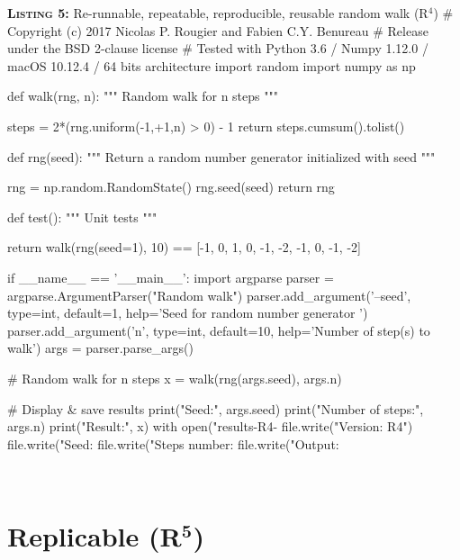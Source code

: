 \documentclass[a4paper,11pt]{article}
\begin{document}
\noindent \begin{minipage}[c]{\linewidth}
\begin{code}{\textbf{\textsc{Listing 5:}} Re-runnable, repeatable, reproducible, reusable random walk (R$^4$)}
# Copyright (c) 2017 Nicolas P. Rougier and Fabien C.Y. Benureau
# Release under the BSD 2-clause license
# Tested with Python 3.6 / Numpy 1.12.0 / macOS 10.12.4 / 64 bits architecture
import random
import numpy as np

def walk(rng, n):
    """ Random walk for n steps """

    steps = 2*(rng.uniform(-1,+1,n) > 0) - 1
    return steps.cumsum().tolist()

def rng(seed):
    """ Return a random number generator initialized with seed """

    rng = np.random.RandomState()
    rng.seed(seed)
    return rng

def test():
    """ Unit tests """

    return walk(rng(seed=1), 10) == [-1, 0, 1, 0, -1, -2, -1, 0, -1, -2]

if __name__ == '__main__':
    import argparse
    parser = argparse.ArgumentParser("Random walk")
    parser.add_argument('--seed', type=int, default=1,
                        help='Seed for random number generator ')
    parser.add_argument('n', type=int, default=10,
                        help='Number of step(s) to walk')
    args = parser.parse_args()

    # Random walk for n steps
    x = walk(rng(args.seed), args.n)

    # Display & save results
    print("Seed:", args.seed)
    print("Number of steps:", args.n)
    print("Result:",  x)
    with open("results-R4-%
        file.write("Version: R4")
        file.write("Seed: %
        file.write("Steps number: %
        file.write("Output: %
\end{code}
\end{minipage}\\

\section*{Replicable (R$^{\mathbf 5}$)}
\end{document}
